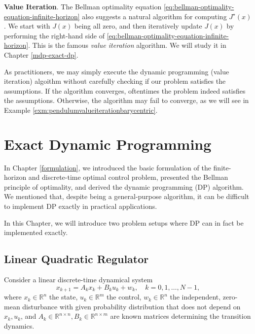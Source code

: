 \documentclass[
]{book}
\theoremstyle{definition}
\theoremstyle{definition}
\theoremstyle{definition}
\theoremstyle{definition}
\theoremstyle{remark}
\begin{document}
\textbf{Value Iteration}. The Bellman optimality equation \eqref{eq:bellman-optimality-equation-infinite-horizon} also suggests a natural algorithm for computing \(J^\star(x)\). We start with \(J(x)\) being all zero, and then iteratively update \(J(x)\) by performing the right-hand side of \eqref{eq:bellman-optimality-equation-infinite-horizon}. This is the famous \emph{value iteration} algorithm. We will study it in Chapter \ref{mdp-exact-dp}.

As practitioners, we may simply execute the dynamic programming (value iteration) algoithm without carefully checking if our problem satisfies the assumptions. If the algorithm converges, oftentimes the problem indeed satisfies the assumptions. Otherwise, the algorithm may fail to converge, as we will see in Example \ref{exm:pendulumvalueiterationbarycentric}.

\hypertarget{exactdp}{%
\chapter{Exact Dynamic Programming}\label{exactdp}}

In Chapter \ref{formulation}, we introduced the basic formulation of the finite-horizon and discrete-time optimal control problem, presented the Bellman principle of optimality, and derived the dynamic programming (DP) algorithm. We mentioned that, despite being a general-purpose algorithm, it can be difficult to implement DP exactly in practical applications.

In this Chapter, we will introduce two problem setups where DP can in fact be implemented exactly.

\hypertarget{lqr}{%
\section{Linear Quadratic Regulator}\label{lqr}}

Consider a linear discrete-time dynamical system
\begin{equation}
x_{k+1} = A_k x_k + B_k u_k + w_k, \quad k=0,1,\dots,N-1,
\label{eq:lqr-linear-system}
\end{equation}
where \(x_k \in \mathbb{R}^n\) the state, \(u_k \in \mathbb{R}^m\) the control, \(w_k \in \mathbb{R}^n\) the independent, zero-mean disturbance with given probability distribution that does not depend on \(x_k,u_k\), and \(A_k \in \mathbb{R}^{n \times n}, B_k \in \mathbb{R}^{n \times m}\) are known matrices determining the transition dynamics.
\end{document}
